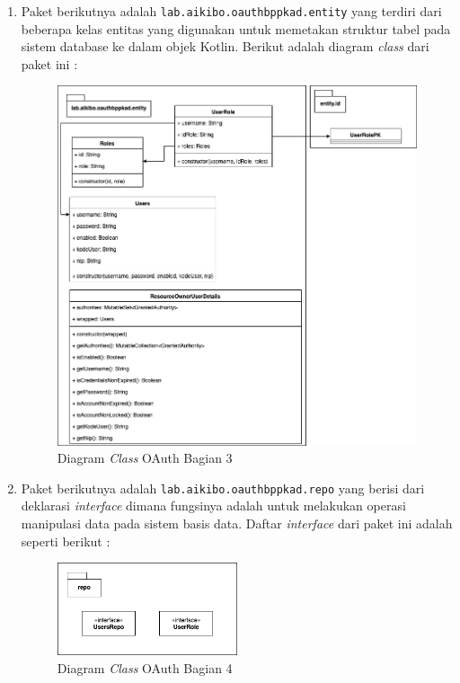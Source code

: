 \documentclass[pdftex,12pt, oneside]{article}
\begin{document}
\begin{enumerate}
	\item Paket berikutnya adalah \texttt{lab.aikibo.oauthbppkad.entity} yang terdiri dari beberapa kelas entitas yang digunakan untuk memetakan struktur tabel pada sistem database ke dalam objek Kotlin. Berikut adalah diagram \textit{class} dari paket ini :

\begin{figure}[H]
	\centering
	\includegraphics[width=1\textwidth]{./resources/class-dia-oauth-2}
	\caption{Diagram \textit{Class} OAuth Bagian 3}
	\label{fig:class-dia-oauth-2}
\end{figure}

	\item Paket berikutnya adalah \texttt{lab.aikibo.oauthbppkad.repo} yang berisi dari deklarasi \textit{interface} dimana fungsinya adalah untuk melakukan operasi manipulasi data pada sistem basis data. Daftar \textit{interface} dari paket ini adalah seperti berikut :

\begin{figure}[H]
	\centering
	\includegraphics[width=0.5\textwidth]{./resources/class-dia-oauth-3}
	\caption{Diagram \textit{Class} OAuth Bagian 4}
	\label{fig:class-dia-oauth-3}
\end{figure}


\end{enumerate}
\end{document}
